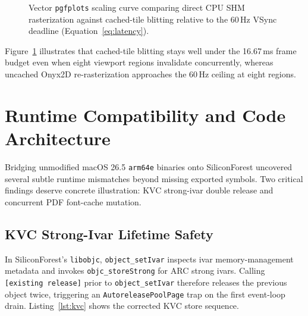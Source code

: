 \documentclass[10pt,twocolumn,letterpaper]{article}
\begin{document}
\begin{figure}[t]
\centering
{}
\caption{Vector \texttt{pgfplots} scaling curve comparing direct CPU SHM rasterization against cached-tile blitting relative to the 60\,Hz VSync deadline (Equation~\ref{eq:latency}).}
\label{fig:pgfplot}
\end{figure}

Figure~\ref{fig:pgfplot} illustrates that cached-tile blitting stays well under the 16.67\,ms frame budget even when eight viewport regions invalidate concurrently, whereas uncached Onyx2D re-rasterization approaches the 60\,Hz ceiling at eight regions.

\section{Runtime Compatibility and Code Architecture}
\label{sec:impl}

Bridging unmodified macOS 26.5 \texttt{arm64e} binaries onto SiliconForest uncovered several subtle runtime mismatches beyond missing exported symbols. Two critical findings deserve concrete illustration: KVC strong-ivar double release and concurrent PDF font-cache mutation.

\subsection{KVC Strong-Ivar Lifetime Safety}
In SiliconForest's \texttt{libobjc}, \texttt{object\_setIvar} inspects ivar memory-management metadata and invokes \texttt{objc\_storeStrong} for ARC strong ivars. Calling \texttt{[existing release]} prior to \texttt{object\_setIvar} therefore releases the previous object twice, triggering an \texttt{AutoreleasePoolPage} trap on the first event-loop drain. Listing~\ref{lst:kvc} shows the corrected KVC store sequence.
\end{document}

